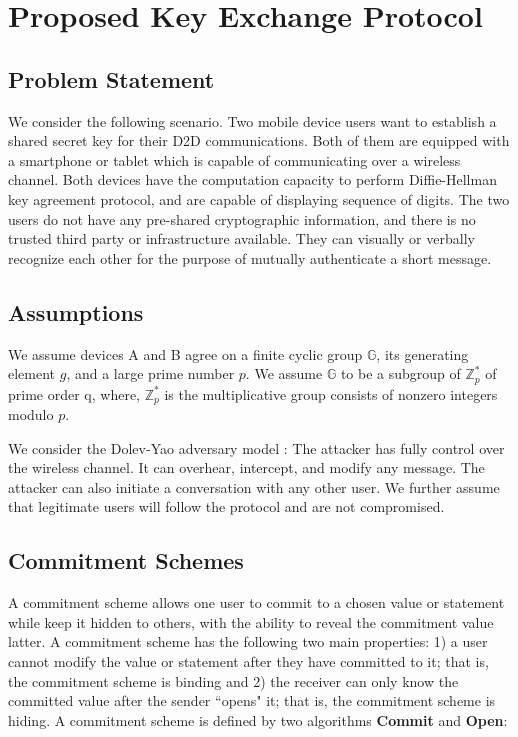 \documentclass[conference]{IEEEtran}
\begin{document}
\section{Proposed Key Exchange Protocol \label{sec3}}




\subsection{Problem Statement}

We consider the following scenario. Two mobile device users want to establish a shared secret key for their D2D communications. Both of them are equipped with a smartphone or tablet which is capable of communicating over a wireless channel. Both devices have the computation capacity to perform Diffie-Hellman key agreement protocol, and are capable of displaying sequence of digits. The two users do not have any pre-shared cryptographic information, and there is no trusted third party or infrastructure available. They can visually or verbally recognize each other for the purpose of mutually authenticate a short message.


\subsection{Assumptions}

We assume devices A and B agree on a finite cyclic group $\mathbb{G}$, its generating element $g$, and a large prime number $p$. We assume $\mathbb{G}$ to be a subgroup of $\mathbb{Z}_p^*$ of prime order q, where, $\mathbb{Z}_p^*$ is the multiplicative group consists of nonzero integers modulo $p$.

We consider the Dolev-Yao adversary model \cite{mao}: The attacker has fully control over the wireless channel. It can overhear, intercept, and modify any message. The attacker can also initiate a conversation with any other user. We further assume that legitimate users will follow the protocol and are not compromised.

\subsection{Commitment Schemes}
A commitment scheme allows one user to commit to a chosen value or statement while keep it hidden to others, with the ability to reveal the commitment value latter. A commitment scheme has the following two main properties: 1) a user cannot modify the value or statement after they have committed to it; that is, the commitment scheme is binding and 2) the receiver can only know the committed value after the sender ``opens" it; that is, the commitment scheme is hiding. A commitment scheme is defined by two algorithms \textbf{Commit} and \textbf{Open}:
\end{document}

